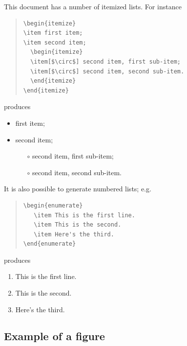 This document has a number of itemized lists. For instance
\begin{quote}
\begin{verbatim}
\begin{itemize}
\item first item;
\item second item;
  \begin{itemize}
  \item[$\circ$] second item, first sub-item;
  \item[$\circ$] second item, second sub-item.
  \end{itemize}
\end{itemize}
\end{verbatim}
\end{quote}
produces
\begin{itemize}
\item first item;
\item second item;
  \begin{itemize}
  \item[$\circ$] second item, first sub-item;
  \item[$\circ$] second item, second sub-item.
  \end{itemize}
\end{itemize}
It is also possible to generate numbered lists; e.g.
\begin{quote}
\begin{verbatim}
\begin{enumerate}
   \item This is the first line.
   \item This is the second.
   \item Here's the third.
\end{enumerate}
\end{verbatim}
\end{quote}
produces
\begin{enumerate}
\item This is the first line.
\item This is the second.
\item Here's the third.
\end{enumerate}

\subsection{Example of a figure}


